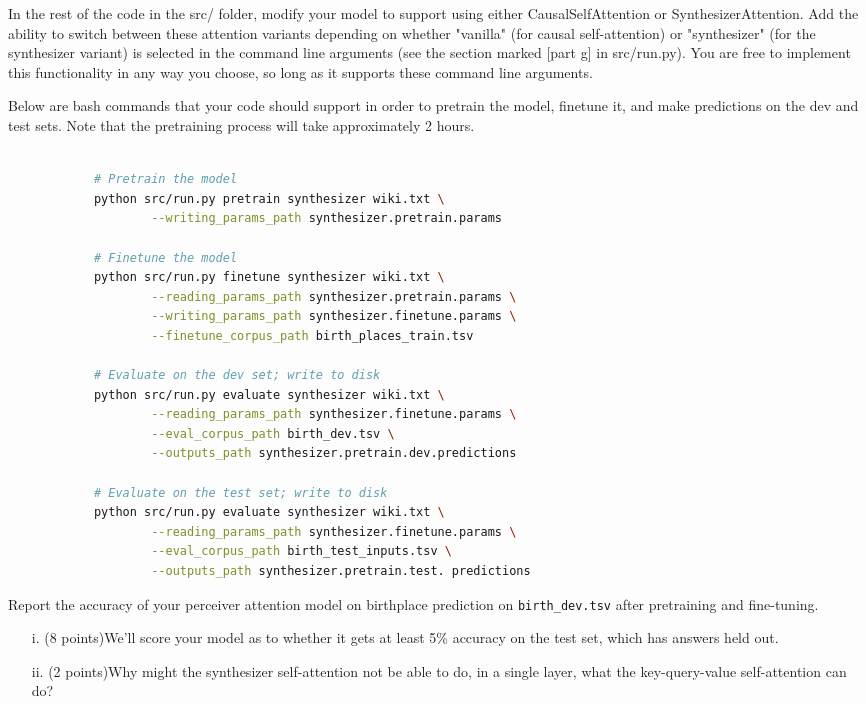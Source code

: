 \documentclass[letterpaper,12pt]{article}
\begin{document}
\begin{itemize}
		In the rest of the code in the src/ folder, modify your model to support using either CausalSelfAttention or SynthesizerAttention. Add the ability to switch between these attention variants depending on whether "vanilla" (for causal self-attention) or "synthesizer" (for the synthesizer variant) is selected in the command line arguments (see the section marked [part g] in src/run.py). You are free to implement this functionality in any way you choose, so long as it supports these command line arguments.
		
		Below are bash commands that your code should support in order to pretrain the model, finetune it, and make predictions on the dev and test sets.
		Note that the pretraining process will take approximately 2 hours. 
		\clearpage
		\begin{lstlisting}[basicstyle=\ttfamily, language=bash]
			
			# Pretrain the model
			python src/run.py pretrain synthesizer wiki.txt \
					--writing_params_path synthesizer.pretrain.params
			
			# Finetune the model
			python src/run.py finetune synthesizer wiki.txt \
					--reading_params_path synthesizer.pretrain.params \
					--writing_params_path synthesizer.finetune.params \
					--finetune_corpus_path birth_places_train.tsv
			
			# Evaluate on the dev set; write to disk
			python src/run.py evaluate synthesizer wiki.txt \
					--reading_params_path synthesizer.finetune.params \
					--eval_corpus_path birth_dev.tsv \
					--outputs_path synthesizer.pretrain.dev.predictions
			
			# Evaluate on the test set; write to disk
			python src/run.py evaluate synthesizer wiki.txt \
					--reading_params_path synthesizer.finetune.params \
					--eval_corpus_path birth_test_inputs.tsv \
					--outputs_path synthesizer.pretrain.test. predictions
		\end{lstlisting}
		
		Report the accuracy of your perceiver attention model on birthplace prediction on \texttt{birth\_dev.tsv} after pretraining and fine-tuning.
		\begin{itemize}
		\item[i.]
			(8 points)We'll score your model as to whether it gets at least 5\% accuracy on the test set, which has answers held out.
			
		\item[ii.]
			(2 points)Why might the synthesizer self-attention not be able to do, in a single layer, what the key-query-value self-attention can do?
		\end{itemize}
		
	\end{itemize}
	
\end{document}
